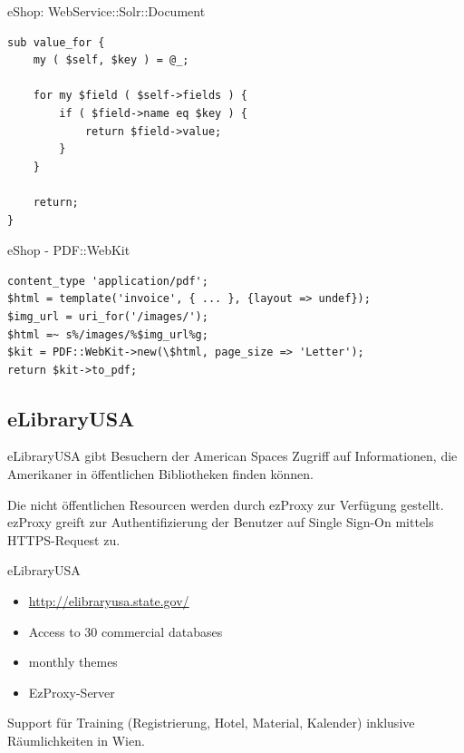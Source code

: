 \begin{frame}[fragile]{eShop: WebService::Solr::Document}
\begin{lstlisting}
sub value_for {
    my ( $self, $key ) = @_;
 
    for my $field ( $self->fields ) {
        if ( $field->name eq $key ) {
            return $field->value;
        }
    }
 
    return;
}
\end{lstlisting}
\end{frame}

\begin{frame}[fragile]{eShop - PDF::WebKit}
\begin{lstlisting}
content_type 'application/pdf';
$html = template('invoice', { ... }, {layout => undef});
$img_url = uri_for('/images/');
$html =~ s%/images/%$img_url%g;
$kit = PDF::WebKit->new(\$html, page_size => 'Letter');
return $kit->to_pdf;
\end{lstlisting}
\end{frame}

\subsection{eLibraryUSA}

eLibraryUSA gibt Besuchern der American Spaces Zugriff
auf Informationen, die Amerikaner in öffentlichen
Bibliotheken finden können.
    
Die nicht öffentlichen Resourcen werden durch ezProxy zur
Verfügung gestellt. ezProxy greift zur Authentifizierung
der Benutzer auf Single Sign-On mittels HTTPS-Request zu.

\begin{frame}{eLibraryUSA}
\begin{itemize}
\item \url{http://elibraryusa.state.gov/}
\item Access to 30 commercial databases
\item monthly themes
\item EzProxy-Server
\end{itemize}
\end{frame}


Support für Training (Registrierung, Hotel, Material, Kalender)
inklusive Räumlichkeiten in Wien.

